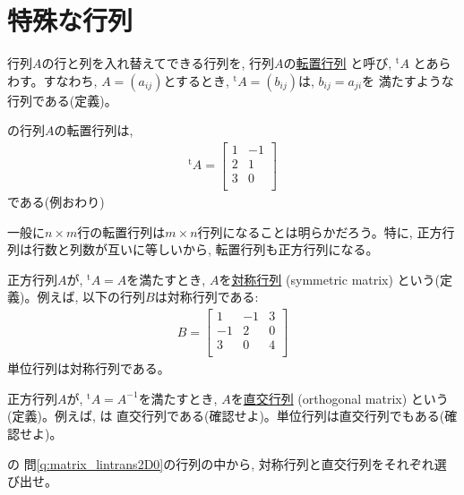 \section{特殊な行列}

行列$A$の行と列を入れ替えてできる行列を, 
行列$A$の\underline{転置行列} と呼び, $^\text{t}A$
とあらわす。すなわち, $A=(a_{ij})$とするとき, $^\text{t}A=(b_{ij})$は, $b_{ij}=a_{ji}$を
満たすような行列である(定義)。

\begin{exmpl} の行列$A$の転置行列は, 
\begin{eqnarray}
^\text{t}A=\begin{bmatrix}
1 & -1\\
2 & 1\\
3 & 0\\
\end{bmatrix}
\label{eq:matrix32ex_trans}
\end{eqnarray}
である(例おわり)\end{exmpl}

一般に$n\times m$行の転置行列は$m\times n$行列になることは明らかだろう。特に, 
正方行列は行数と列数が互いに等しいから, 転置行列も正方行列になる。

正方行列$A$が, $^\text{t}A=A$を満たすとき, $A$を\underline{対称行列} (symmetric matrix)
という(定義)。例えば, 以下の行列$B$は対称行列である:
\begin{eqnarray}
B=\begin{bmatrix}
1  & -1 & 3\\
-1 & 2  & 0\\
3  & 0  & 4\\
\end{bmatrix}
\label{eq:matrix_symmetric}\end{eqnarray}
単位行列は対称行列である。

正方行列$A$が, $^\text{t}A=A^{-1}$を満たすとき, $A$を\underline{直交行列} (orthogonal matrix)
という (定義)。例えば, は
直交行列である(確認せよ)。単位行列は直交行列でもある(確認せよ)。

\begin{q}\label{q:matrix_symm_orth2D} の
問\ref{q:matrix_lintrans2D0}の行列の中から, 対称行列と直交行列をそれぞれ選び出せ。\end{q}
\hv




